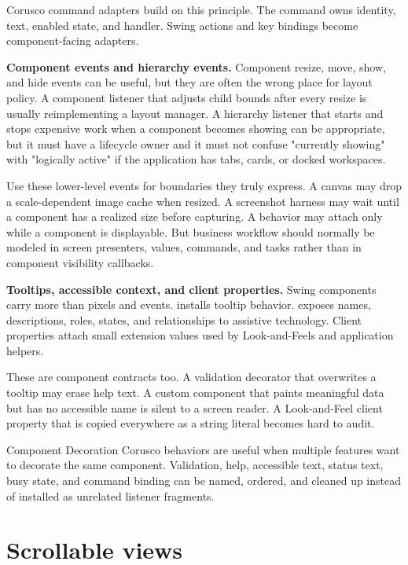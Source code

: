 Corusco command adapters build on this principle. The command owns identity, text, enabled state, and handler. Swing actions and key bindings become component-facing adapters.

\textbf{Component events and hierarchy events.} Component resize, move, show, and hide events can be useful, but they are often
the wrong place for layout policy. A component listener that adjusts child
bounds after every resize is usually reimplementing a layout manager. A
hierarchy listener that starts and stops expensive work when a component becomes
showing can be appropriate, but it must have a lifecycle owner and it must not
confuse "currently showing" with "logically active" if the application has tabs,
cards, or docked workspaces.

Use these lower-level events for boundaries they truly express. A canvas may
drop a scale-dependent image cache when resized. A screenshot harness may wait
until a component has a realized size before capturing. A behavior may attach
only while a component is displayable. But business workflow should normally be
modeled in screen presenters, values, commands, and tasks rather than in component
visibility callbacks.

\textbf{Tooltips, accessible context, and client properties.} Swing components carry more than pixels and events.  installs tooltip behavior.  exposes names, descriptions, roles, states, and relationships to assistive technology. Client properties attach small extension values used by Look-and-Feels and application helpers.

These are component contracts too. A validation decorator that overwrites a tooltip may erase help text. A custom component that paints meaningful data but has no accessible name is silent to a screen reader. A Look-and-Feel client property that is copied everywhere as a string literal becomes hard to audit.

\begin{coruscobox}{Component Decoration}
Corusco behaviors are useful when multiple features want to decorate the same component. Validation, help, accessible text, status text, busy state, and command binding can be named, ordered, and cleaned up instead of installed as unrelated listener fragments.
\end{coruscobox}

\section{Scrollable views}


